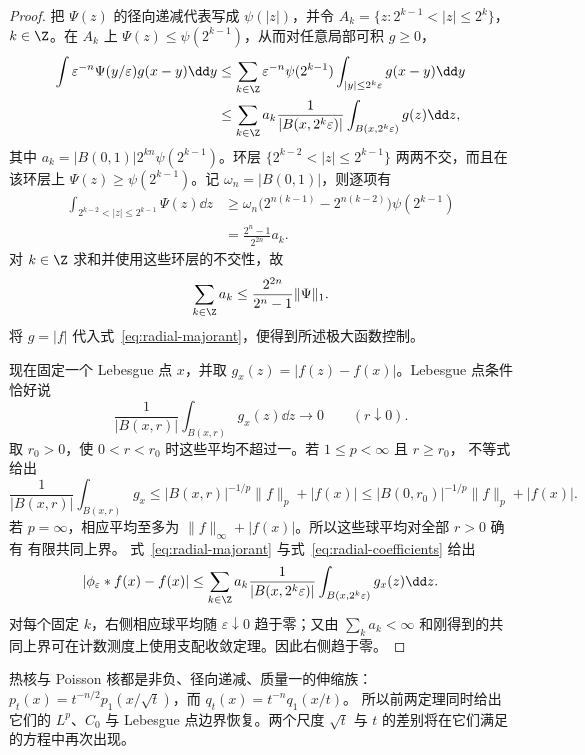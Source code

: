 \begin{proof}
把 $\Psi(z)$ 的径向递减代表写成 $\psi(|z|)$，并令
$A_k=\{z:2^{k-1}<|z|\le2^k\}$，$k\in\Z$。在 $A_k$ 上
$\Psi(z)\le\psi(2^{k-1})$，从而对任意局部可积 $g\ge0$，
\begin{align}
 \int\varepsilon^{-n}\Psi(y/\varepsilon)g(x-y)\dd y
 &\le \sum_{k\in\Z}\varepsilon^{-n}\psi(2^{k-1})
       \int_{|y|\le2^k\varepsilon}g(x-y)\dd y \notag\\
 &\le \sum_{k\in\Z}a_k
   \frac1{|B(x,2^k\varepsilon)|}
   \int_{B(x,2^k\varepsilon)}g(z)\dd z,                 \label{eq:radial-majorant}
\end{align}
其中 $a_k=|B(0,1)|2^{kn}\psi(2^{k-1})$。环层
$\{2^{k-2}<|z|\le2^{k-1}\}$ 两两不交，而且在该环层上
$\Psi(z)\ge\psi(2^{k-1})$。记 $\omega_n=|B(0,1)|$，则逐项有
\begin{align*}
 \int_{2^{k-2}<|z|\leq2^{k-1}}\Psi(z)\dd z
 &\geq \omega_n\bigl(2^{n(k-1)}-2^{n(k-2)}\bigr)
          \psi(2^{k-1})\\
 &=\frac{2^n-1}{2^{2n}}a_k.
\end{align*}
对 $k\in\Z$ 求和并使用这些环层的不交性，故
\begin{equation}\label{eq:radial-coefficients}
 \sum_{k\in\Z}a_k
 \leq\frac{2^{2n}}{2^n-1}\|\Psi\|_1.
\end{equation}
将 $g=|f|$ 代入式~\eqref{eq:radial-majorant}，便得到所述极大函数控制。

现在固定一个 Lebesgue 点 $x$，并取
$g_x(z)=|f(z)-f(x)|$。Lebesgue 点条件恰好说
\[
 \frac1{|B(x,r)|}\int_{B(x,r)}g_x(z)\dd z\longrightarrow0
 \qquad(r\downarrow0).
\]
取 $r_0>0$，使 $0<r<r_0$ 时这些平均不超过一。若 $1\leq p<\infty$ 且 $r\geq r_0$，
\Holder{} 不等式给出
\[
 \frac1{|B(x,r)|}\int_{B(x,r)}g_x
 \leq |B(x,r)|^{-1/p}\|f\|_p+|f(x)|
 \leq |B(0,r_0)|^{-1/p}\|f\|_p+|f(x)|.
\]
若 $p=\infty$，相应平均至多为 $\|f\|_\infty+|f(x)|$。所以这些球平均对全部 $r>0$ 确有
有限共同上界。
式~\eqref{eq:radial-majorant} 与式~\eqref{eq:radial-coefficients} 给出
\[
 |\phi_\varepsilon*f(x)-f(x)|
 \le\sum_{k\in\Z}a_k
 \frac1{|B(x,2^k\varepsilon)|}
 \int_{B(x,2^k\varepsilon)}g_x(z)\dd z.
\]
对每个固定 $k$，右侧相应球平均随 $\varepsilon\downarrow0$ 趋于零；又由
$\sum_ka_k<\infty$ 和刚得到的共同上界可在计数测度上使用支配收敛定理。因此右侧趋于零。
\end{proof}

热核与 Poisson 核都是非负、径向递减、质量一的伸缩族：
$p_t(x)=t^{-n/2}p_1(x/\sqrt t)$，而 $q_t(x)=t^{-n}q_1(x/t)$。
所以前两定理同时给出它们的 $L^p$、$C_0$ 与 Lebesgue 点边界恢复。两个尺度
$\sqrt t$ 与 $t$ 的差别将在它们满足的方程中再次出现。

